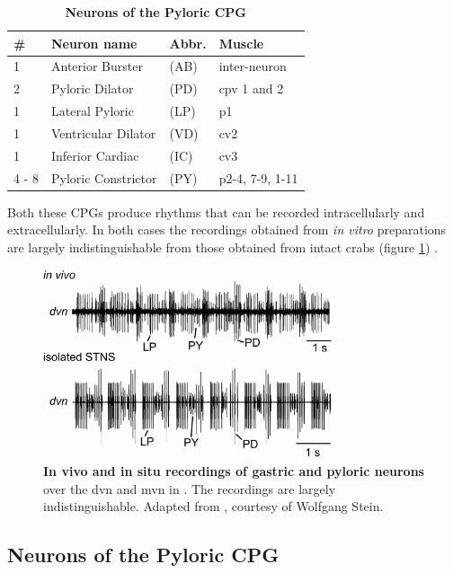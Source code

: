 \begin{table}
	\centering
	\caption[Neurons of the Pyloric \ac{CPG}]{\textbf{Neurons of the Pyloric \ac{CPG}}}
	\label{tab:pyloric}
	\begin{tabular}{l l l l}
		\hline
		\bf \# & \bf Neuron name & \bf Abbr. & \bf Muscle\\ \hline
		1 & Anterior Burster & (AB) & inter-neuron \\ 
		2 & Pyloric Dilator & (PD) & cpv 1 and 2 \\ 
		1 & Lateral Pyloric & (LP) & p1 \\ 
		1 & Ventricular Dilator & (VD) & cv2 \\ 
		1 & Inferior Cardiac & (IC) & cv3 \\ 
		4 - 8 & Pyloric Constrictor & (PY) & p2-4, 7-9, 1-11 \\ 
		\hline
	\end{tabular}
\end{table}

Both these \acp{CPG}
produce rhythms that can be recorded intracellularly and extracellularly. In both cases the recordings obtained from \textit{in vitro} preparations are largely indistinguishable from those obtained from intact crabs  (figure \ref{fig:pyloric_rhythm_in_vivo_in_vitro}) \cite{Hedrich2011}.

\begin{figure}[H]
	\centering
		\includegraphics[width=8.5cm]{graphics/pyloric_rhythm_in_vivo_in_vitro.png}
		\caption[In vivo and in situ recordings of gastric and pyloric neurons]{\textbf{In vivo and in situ recordings of gastric and pyloric neurons} over the \ac{dvn} and \ac{mvn} in . The recordings are largely indistinguishable. Adapted from \cite{Hedrich2011}, courtesy of Wolfgang Stein.} 
		\label{fig:pyloric_rhythm_in_vivo_in_vitro}
\end{figure}


\subsection{Neurons of the Pyloric CPG}

